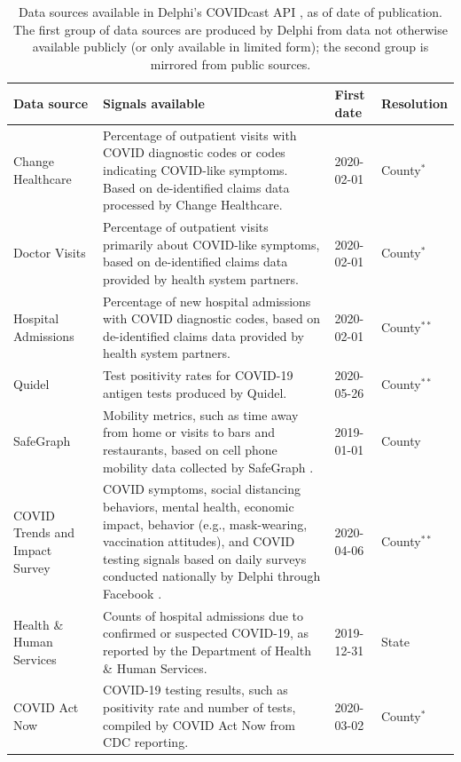 \documentclass[9pt,twocolumn,twoside,lineno]{pnas-new}
\begin{document}
\begin{table}[t]
\centering
\caption{Data sources available in Delphi's COVIDcast API \cite{CovidcastAPI},
  as of date of publication. The first group of data sources are produced by
  Delphi from data not otherwise available publicly (or only available in
  limited form); the second group is mirrored from public sources.}
\begin{tabular}{>{\raggedright}p{1.2in} p{4.0in} l >{\raggedright\arraybackslash}p{0.5in}}
  \toprule
  \textbf{Data source} & \textbf{Signals available} & \textbf{First date} &
\textbf{Resolution} \\\midrule
  Change Healthcare & Percentage of outpatient visits with COVID diagnostic
codes or codes indicating COVID-like symptoms. Based on de-identified claims
data processed by Change Healthcare. & 2020-02-01 & County$^*$ \\
  Doctor Visits & Percentage of outpatient visits primarily about COVID-like
symptoms, based on de-identified claims data provided by health system
partners. & 2020-02-01 & County$^*$ \\
  Hospital Admissions & Percentage of new hospital admissions with COVID
diagnostic codes, based on de-identified claims data provided by health system
partners. & 2020-02-01 & County$^{**}$\\
  Quidel & Test positivity rates for COVID-19 antigen tests produced by
Quidel. & 2020-05-26 & County$^{**}$ \\
  SafeGraph & Mobility metrics, such as time away from home or visits to bars 
and restaurants, based on cell phone mobility data collected by SafeGraph
\cite{SafeGraphSocial, SafeGraphPatterns}. & 2019-01-01 & County \\
  COVID Trends and Impact Survey & COVID symptoms, social distancing 
behaviors, mental health, economic impact, behavior (e.g., mask-wearing,
vaccination attitudes), and COVID testing signals based on daily surveys
conducted nationally by Delphi through Facebook \cite{DelphiSurvey,
Kreuter:2020}. & 2020-04-06 & County$^{**}$ \\
  \midrule
  Health \& Human Services & Counts of hospital admissions due to confirmed or 
suspected COVID-19, as reported by the Department of Health \& Human Services. &
2019-12-31 & State \\
  COVID Act Now & COVID-19 testing results, such as positivity rate and number
of tests, compiled by COVID Act Now from CDC reporting. & 2020-03-02 &
County$^*$ \\

\end{tabular}
\end{table}
\end{document}
